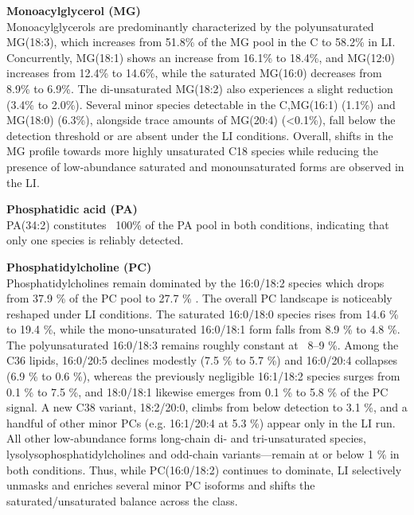 \documentclass[10pt,letterpaper]{article}
\begin{document}
\textbf{Monoacylglycerol (MG)}  \\
Monoacylglycerols are predominantly characterized by the polyunsaturated MG(18:3), which increases from 51.8\% of the MG pool in the C to 58.2\% in LI. Concurrently, MG(18:1) shows an increase from 16.1\% to 18.4\%, and MG(12:0) increases from 12.4\% to 14.6\%, while the saturated MG(16:0) decreases from 8.9\% to 6.9\%. The di-unsaturated MG(18:2) also experiences a slight reduction (3.4\% to 2.0\%). Several minor species detectable in the C,MG(16:1) (1.1\%) and MG(18:0) (6.3\%), alongside trace amounts of MG(20:4) (\textless0.1\%), fall below the detection threshold or are absent under the LI conditions. Overall, shifts in the MG profile towards more highly unsaturated C18 species while reducing the presence of low-abundance saturated and monounsaturated forms are observed in the LI.

\textbf{Phosphatidic acid (PA)}  \\
PA(34:2) constitutes ~100\% of the PA pool in both conditions, indicating that only one species is reliably detected.

\textbf{Phosphatidylcholine (PC)} \\ 
Phosphatidylcholines remain dominated by the 16:0/18:2 species which drops from 37.9 \% of the PC pool to 27.7 \% . The overall PC landscape is noticeably reshaped under LI conditions. The saturated 16:0/18:0 species rises from 14.6 \% to 19.4 \%, while the mono-unsaturated 16:0/18:1 form falls from 8.9 \% to 4.8 \%. The polyunsaturated 16:0/18:3 remains roughly constant at ~8–9 \%. Among the C36 lipids, 16:0/20:5 declines modestly (7.5 \% to 5.7 \%) and 16:0/20:4 collapses (6.9 \% to 0.6 \%), whereas the previously negligible 16:1/18:2 species surges from 0.1 \% to 7.5 \%, and 18:0/18:1 likewise emerges from 0.1 \% to 5.8 \% of the PC signal. A new C38 variant, 18:2/20:0, climbs from below detection to 3.1 \%, and a handful of other minor PCs (e.g. 16:1/20:4 at 5.3 \%) appear only in the LI run. All other low-abundance forms long-chain di- and tri-unsaturated species, lysolysophosphatidylcholines and odd-chain variants—remain at or below 1 \% in both conditions. Thus, while PC(16:0/18:2) continues to dominate, LI selectively unmasks and enriches several minor PC isoforms and shifts the saturated/unsaturated balance across the class.
\end{document}
